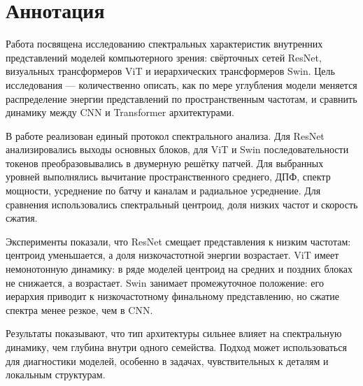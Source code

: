 \chapter*{Аннотация}       %
Работа посвящена исследованию спектральных характеристик внутренних представлений моделей компьютерного зрения: свёрточных сетей ResNet, визуальных трансформеров ViT и иерархических трансформеров Swin. Цель исследования — количественно описать, как по мере углубления модели меняется распределение энергии представлений по пространственным частотам, и сравнить динамику между CNN и Transformer архитектурами.

В работе реализован единый протокол спектрального анализа. Для ResNet анализировались выходы основных блоков, для ViT и Swin последовательности токенов преобразовывались в двумерную решётку патчей. Для выбранных уровней выполнялись вычитание пространственного среднего, ДПФ, спектр мощности, усреднение по батчу и каналам и радиальное усреднение. Для сравнения использовались спектральный центроид, доля низких частот и скорость сжатия.

Эксперименты показали, что ResNet смещает представления к низким частотам: центроид уменьшается, а доля низкочастотной энергии возрастает. ViT имеет немонотонную динамику: в ряде моделей центроид на средних и поздних блоках не снижается, а возрастает. Swin занимает промежуточное положение: его иерархия приводит к низкочастотному финальному представлению, но сжатие спектра менее резкое, чем в CNN.

Результаты показывают, что тип архитектуры сильнее влияет на спектральную динамику, чем глубина внутри одного семейства. Подход может использоваться для диагностики моделей, особенно в задачах, чувствительных к деталям и локальным структурам.